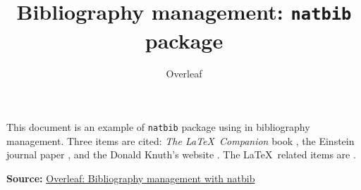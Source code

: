 \documentclass{article}
\title{\bfseries Bibliography management: \texttt{natbib} package}
\author{Overleaf}
\date { }
\begin{document}
 
\maketitle
 
This document is an example of \texttt{natbib} package using in bibliography 
management. Three items are cited: \textit{The \LaTeX\ Companion} book \cite{latexcompanion}, the Einstein journal paper \citet{einstein}, and the 
Donald Knuth's website \cite{knuthwebsite}. The \LaTeX\ related items are
\cite{latexcompanion,einstein,knuthwebsite}. 
 

\textbf{Source:} \href{https://www.overleaf.com/learn/latex/Bibliography_management_with_natbib}{Overleaf: Bibliography management with natbib}
 
\medskip
 

 
\end{document}
